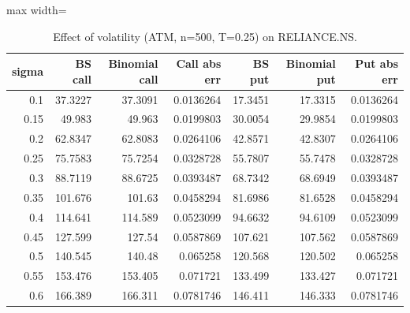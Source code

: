 \begin{table}
\centering
\small
\caption{Effect of volatility (ATM, n=500, T=0.25) on RELIANCE.NS.}
\label{tab:e4_volatility}
\begin{adjustbox}{max width=\textwidth}
\begin{tabular}{rrrrrrr}
\toprule
sigma & BS call & Binomial call & Call abs err & BS put & Binomial put & Put abs err \\
\midrule
0.1 & 37.3227 & 37.3091 & 0.0136264 & 17.3451 & 17.3315 & 0.0136264 \\
0.15 & 49.983 & 49.963 & 0.0199803 & 30.0054 & 29.9854 & 0.0199803 \\
0.2 & 62.8347 & 62.8083 & 0.0264106 & 42.8571 & 42.8307 & 0.0264106 \\
0.25 & 75.7583 & 75.7254 & 0.0328728 & 55.7807 & 55.7478 & 0.0328728 \\
0.3 & 88.7119 & 88.6725 & 0.0393487 & 68.7342 & 68.6949 & 0.0393487 \\
0.35 & 101.676 & 101.63 & 0.0458294 & 81.6986 & 81.6528 & 0.0458294 \\
0.4 & 114.641 & 114.589 & 0.0523099 & 94.6632 & 94.6109 & 0.0523099 \\
0.45 & 127.599 & 127.54 & 0.0587869 & 107.621 & 107.562 & 0.0587869 \\
0.5 & 140.545 & 140.48 & 0.065258 & 120.568 & 120.502 & 0.065258 \\
0.55 & 153.476 & 153.405 & 0.071721 & 133.499 & 133.427 & 0.071721 \\
0.6 & 166.389 & 166.311 & 0.0781746 & 146.411 & 146.333 & 0.0781746 \\
\bottomrule
\end{tabular}
\end{adjustbox}
\end{table}
